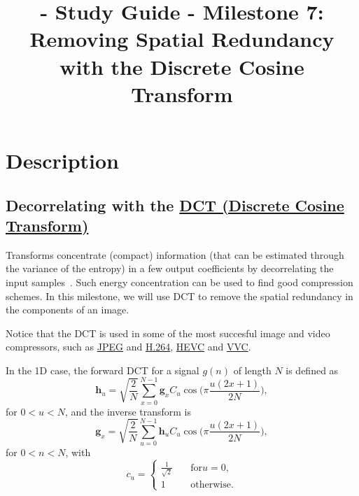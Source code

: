 
\title{\SM{} - Study Guide - Milestone 7: Removing Spatial Redundancy with the Discrete Cosine Transform}

\maketitle

\tableofcontents

\section{Description}

\subsection{Decorrelating with the \href{https://en.wikipedia.org/wiki/Discrete_cosine_transform}{DCT
(Discrete Cosine Transform)}}

Transforms concentrate (compact) information (that can be estimated
through the variance of the entropy) in a few output coefficients by
decorrelating the input samples~\cite{sayood2017introduction}. Such
energy concentration can be used to find good compression schemes. In
this milestone, we will use DCT to remove the spatial redundancy in
the components of an image.

Notice that the DCT is used in some of the most succesful image and
video compressors, such as
\href{https://en.wikipedia.org/wiki/JPEG}{JPEG} and
\href{https://en.wikipedia.org/wiki/Advanced_Video_Coding}{H.264},
\href{https://en.wikipedia.org/wiki/Advanced_Video_Coding}{HEVC} and
\href{https://en.wikipedia.org/wiki/Versatile_Video_Coding}{VVC}.

In the 1D case, the forward DCT for a signal $g(n)$ of
length $N$ is defined as~\cite{burger2016digital}
\begin{equation}
  {\mathbf h}_u = \sqrt{\frac{2}{N}}\sum_{x=0}^{N-1}{\mathbf
    g}_xC_u\cos\Big(\pi\frac{u(2x+1)}{2N}\Big),
\end{equation}
for $0<u<N$, and the inverse transform is
\begin{equation}
  {\mathbf g}_x = \sqrt{\frac{2}{N}}\sum_{u=0}^{N-1}{\mathbf
    h}_uC_u\cos\Big(\pi\frac{u(2x+1)}{2N}\Big),
\end{equation}
for $0<n<N$, with
\begin{equation}
  c_u = \left\{
  \begin{array}{ll}
    \frac{1}{\sqrt{2}} & \quad \text{for} u=0, \\
    1 & \quad \text{otherwise}.
  \end{array}
  \right.
\end{equation}

